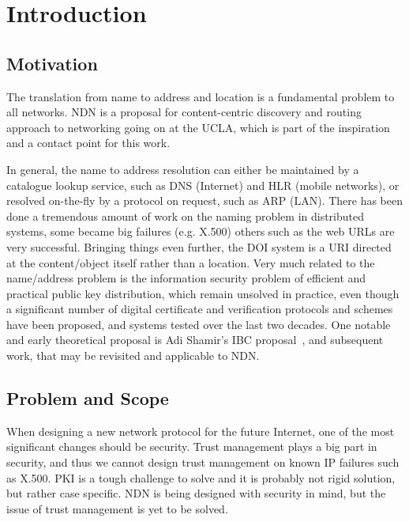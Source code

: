 \chapter{Introduction}\label{chp:introduction} 

\section{Motivation}
The translation from name to address and location is a fundamental problem to all networks.
\gls{NDN} is a proposal for content-centric discovery and routing approach to networking
going on at the \gls{UCLA}, which is part of the inspiration and a contact point for this work.

In general, the name to address resolution can either be maintained by a catalogue lookup service, 
such as \gls{DNS} (Internet) and \gls{HLR} (mobile networks), 
or resolved on-the-fly by a protocol on request, such as \gls{ARP} (\gls{LAN}). 
There has been done a tremendous amount of work on the naming problem in distributed systems, 
some became big failures (e.g. X.500) others such as the web \gls{URL}s are very successful. 
Bringing things even further, the \gls{DOI} system is a \gls{URI} directed at the content/object itself rather than a location. 
Very much related to the name/address problem is the information security problem of efficient and practical public key distribution, 
which remain unsolved in practice, even though a significant number of digital certificate and verification protocols and schemes have been proposed, and systems tested over the last two decades. 
One notable and early theoretical proposal is Adi Shamir's \gls{IBC} proposal~\cite{DBLP:conf/crypto/Shamir84},
and subsequent work, that may be revisited and applicable to \gls{NDN}.

\section{Problem and Scope}

When designing a new network protocol for the future Internet, one of the most significant changes should be security.
Trust management plays a big part in security, and thus we cannot design trust management on known \gls{IP} failures such as X.500. 
\gls{PKI} is a tough challenge to solve and it is probably not rigid solution, but rather case specific.
\gls{NDN} is being designed with security in mind, but the issue of trust management is yet to be solved.

